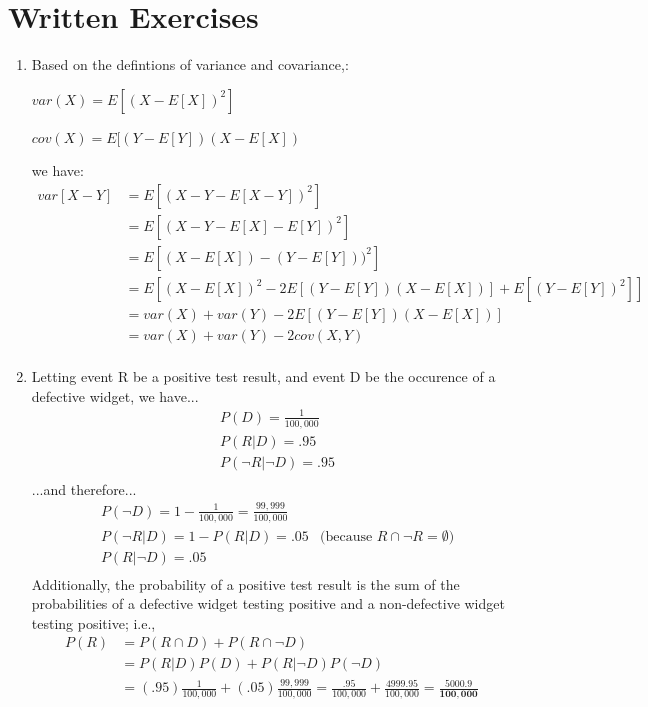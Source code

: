 \documentclass{report}
\begin{document}
\section*{Written Exercises}	
\begin{enumerate}
	\item Based on the defintions of variance and covariance,:\\
	\centerline{$var(X) = E[(X - E[X])^2]$}
	\centerline{$cov(X) = E[(Y - E[Y])(X - E[X])$}
	we have:
	\begin{align*}
    var[X-Y] &= E[( X - Y - E[X - Y])^2]  \\
    	 	 &= E[( X - Y - E[X] - E[Y])^2] \\
    	 	 &= E[( X - E[X]) - (Y - E[Y]) )^2] \\
    	 	 &= E[( X - E[X])^2 - 2E[(Y - E[Y])(X - E[X])] + E[(Y - E[Y])^2]] \\
    	 	 &= var(X) + var(Y) - 2E[(Y - E[Y])(X - E[X])] \\
    	 	 &= var(X) + var(Y) - 2cov(X,Y ) \\
    \end{align*}
	\item Letting event R be a positive test result, and event D be the occurence of a defective widget, we have...
	\begin{align*}
	     & P(D) = \frac{1}{100,000} \\
	     & P(R \vert D) = .95  \\
	     & P(\lnot R \vert \lnot D) = .95 \\
	 \end{align*}
	    ...and therefore...
	    \begin{align*}
	     & P(\lnot D) 				= 1 - \frac{1}{100,000} = \frac{99,999}{100,000} \\
	     & P(\lnot R \vert 		D) 	= 1-  P(R \vert D) =.05  & 
	     \text{(because $R \cap \lnot R = \emptyset$)}\\
	     & P(R 		\vert \lnot D) 	= .05  \\
	 	\end{align*}
	 	Additionally, the probability of a positive test result is the sum of the probabilities of a  defective widget testing positive and a non-defective widget testing positive; i.e.,
	 	\begin{align*}
	 	 P(R) 	&= P(R \cap D) + P(R \cap \lnot D)\\
	 	 		&= P(R \vert D)P(D) + P(R \vert \lnot D)P(\lnot D) \\
	 	 		&= (.95)\frac{1}{100,000} + (.05)\frac{99,999}{100,000} 
	 	 		 = \frac{.95}{100,000} + \frac{4999.95}{100,000} 
	 	 		 = \mathbf{\frac{5000.9}{100,000}}\\
	    \end{align*}
	    

\end{enumerate}
\end{document}
